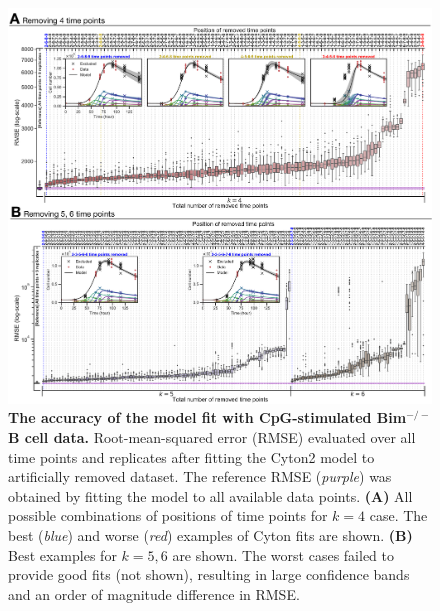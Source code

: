 \documentclass[11pt, a4paper]{article}
\begin{document}
\begin{figure}[h]
    \centering
    \includegraphics[scale=0.58]{figs/supp_fig6.pdf}
    \caption{\textbf{The accuracy of the model fit with CpG-stimulated Bim$^{-/-}$ B cell data.} Root-mean-squared error (RMSE) evaluated over all time points and replicates after fitting the Cyton2 model to artificially removed dataset. The reference RMSE (\textit{purple}) was obtained by fitting the model to all available data points. \textbf{(A)} All possible combinations of positions of time points for $k=4$ case. The best (\textit{blue}) and worse (\textit{red}) examples of Cyton fits are shown. \textbf{(B)} Best examples for $k=5,6$ are shown. The worst cases failed to provide good fits (not shown), resulting in large confidence bands and an order of magnitude difference in RMSE.}
    \label{supp_fig:removed_time_points}
\end{figure}
\end{document}
